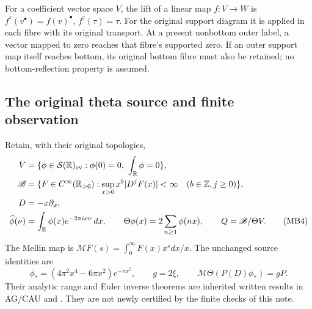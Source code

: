 \documentclass[11pt,a4paper]{article}
\theoremstyle{definition}
\begin{document}
For a coefficient vector space $V$, the lift of a linear map $f:V\to W$ is
$f^\tau(v^\bullet)=f(v)^\bullet$, $f^\tau(\tau)=\tau$.
For the original support diagram it is applied in each fibre with its
original transport. At a present nonbottom outer label, a vector mapped
to zero reaches that fibre's supported zero. If an outer support map
itself reaches bottom, its original bottom fibre must also be retained;
no bottom-reflection property is assumed.

\subsection{The original theta source and finite observation}
Retain, with their original topologies,
\begin{align}
 V&=\{\phi\in\mathcal S(\mathbb R)_{\rm ev}:\phi(0)=0,
                         \ \int_{\mathbb R}\phi=0\},\nonumber\\
 \mathscr B&=\{F\in C^\infty(\mathbb R_{>0}):
 \sup_{x>0}x^b|D^jF(x)|<\infty\quad(b\in\mathbb Z,j\geq0)\},
\nonumber\\
 D&=-x\partial_x,\nonumber\\
 \widehat\phi(\nu)&=\int_{\mathbb R}\phi(x)e^{-2\pi ix\nu}\,dx,
 \qquad\Theta\phi(x)=2\sum_{n\geq1}\phi(nx),
 \qquad Q=\mathscr B/\Theta V.                         \tag{MB4}
\end{align}
The Mellin map is $\mathcal MF(s)=\int_0^\infty F(x)x^s dx/x$.
The unchanged source identities are
\begin{equation}
 \phi_*=(4\pi^2x^4-6\pi x^2)e^{-\pi x^2},\qquad
 g=2\xi,\qquad \mathcal M\Theta(P(D)\phi_*)=gP.          \tag{MB5}
\end{equation}
Their analytic range and Euler inverse theorems are inherited written
results in AG/CAU and . They are not newly
certified by the finite checks of this note.
\end{document}
